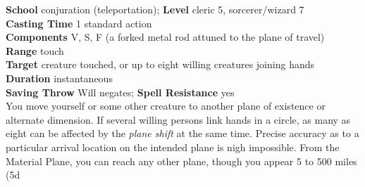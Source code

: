 \textbf{School} conjuration (teleportation); \textbf{Level} cleric 5, sorcerer/wizard 7\\
\textbf{Casting Time} 1 standard action\\
\textbf{Components} V, S, F (a forked metal rod attuned to the plane of travel)\\
\textbf{Range} touch\\
\textbf{Target} creature touched, or up to eight willing creatures joining hands\\
\textbf{Duration} instantaneous\\
\textbf{Saving Throw }Will negates; \textbf{Spell Resistance} yes\\
You move yourself or some other creature to another plane of existence or alternate dimension. If several willing persons link hands in a circle, as many as eight can be affected by the \textit{plane shift }at the same time. Precise accuracy as to a particular arrival location on the intended plane is nigh impossible. From the Material Plane, you can reach any other plane, though you appear 5 to 500 miles (5d%
